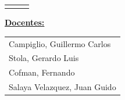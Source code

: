 \begin{tabbing}
	\begin{tabular}{ l l l }
	   
	    \padronrodri & \nombrerodri & \mailrodri\\
	    
	\end{tabular}
\end{tabbing}
\textbf{\underline{Docentes:}} \\
\begin{tabbing}
	\begin{tabular}{ l }
	   
	    Campiglio, Guillermo Carlos\\
	    Stola, Gerardo Luis\\
	    Cofman, Fernando\\ 
	    Salaya Velazquez, Juan Guido
	    
	\end{tabular}
\end{tabbing}
\centering 
\HRule
\begin{abstract}
\justify
\resumen
\medskip
\end{abstract}
\justify
\HRule
\medskip

\tableofcontents
\pagebreak